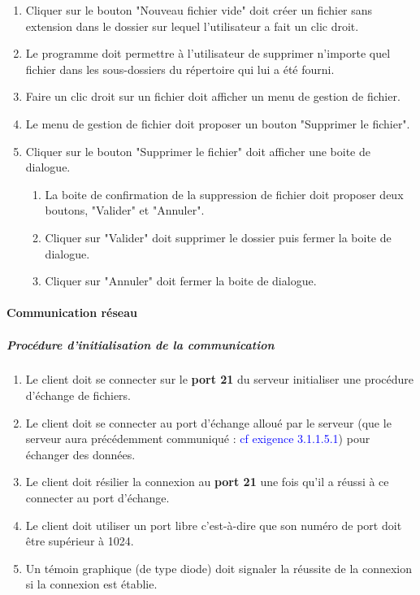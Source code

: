 \documentclass[10pt,a4paper]{report}
\begin{document}
\begin{enumerate}
		\item Cliquer sur le bouton "Nouveau fichier vide" doit créer un fichier sans extension dans le dossier sur lequel l'utilisateur a fait un clic droit.
		\item Le programme doit permettre à l'utilisateur de supprimer n'importe quel fichier dans les sous-dossiers du répertoire qui lui a été fourni.
		\item Faire un clic droit sur un fichier doit afficher un menu de gestion de fichier.
		\item Le menu de gestion de fichier doit proposer un bouton "Supprimer le fichier".
		\item Cliquer sur le bouton "Supprimer le fichier" doit afficher une boite de dialogue.
		\begin{enumerate}[label=\arabic*.]
			\item La boite de confirmation de la suppression de fichier doit proposer deux boutons, "Valider" et "Annuler".
			\item Cliquer sur "Valider" doit supprimer le dossier puis fermer la boite de dialogue.
			\item Cliquer sur "Annuler" doit fermer la boite de dialogue.
		\end{enumerate}
	\end{enumerate}
	
\paragraph{Communication réseau}

	\subparagraph{Procédure d'initialisation de la communication}

		\begin{enumerate}

			\item Le client doit se connecter sur le \textbf{port 21} du serveur initialiser une procédure d'échange de fichiers.
			\item Le client doit se connecter au port d'échange alloué par le serveur (que le serveur aura précédemment communiqué : \textcolor{blue}{cf exigence 3.1.1.5.1}) pour échanger des données.
			\item Le client doit résilier la connexion au \textbf{port 21} une fois qu'il a réussi à ce connecter au port d'échange.
			\item Le client doit utiliser un port libre c'est-à-dire que son numéro de port doit être supérieur à 1024.
			\item Un témoin graphique (de type diode) doit signaler la réussite de la connexion si la connexion est établie. 
			\end{enumerate}
\end{document}
